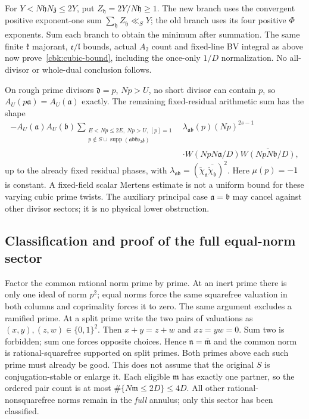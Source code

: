 For $Y<N\mathfrak hN\mathfrak z\le2Y$, put
$Z_{\mathfrak h}=2Y/N\mathfrak h\ge1$.
The new branch uses the convergent positive exponent-one sum
$\sum_{\mathfrak h}Z_{\mathfrak h}\ll_SY$; the old branch uses
its four positive $\Phi$ exponents. Sum each branch to obtain the
minimum after summation. The same finite $\mathfrak k$ majorant,
$\mathfrak e/\mathfrak l$ bounds, actual $A_2$ count and fixed-line
BV integral as above now prove~\eqref{cbk:cubic-bound}, including
the once-only $1/D$ normalization. No all-divisor or whole-dual
conclusion follows.

On rough prime divisors $\mathfrak d=p$, $Np>U$, no short divisor
can contain $p$, so $A_U(p\mathfrak a)=A_U(\mathfrak a)$ exactly.
The remaining fixed-residual arithmetic sum has the shape
\begin{equation}\label{cbk:prime-failure}
 \begin{split}
 -A_U(\mathfrak a)A_U(\mathfrak b)
 \sum_{\substack{E<Np\le2E,\ Np>U,\ [p]=1\\
      p\notin S\cup\operatorname{supp}(\mathfrak a\mathfrak b
                    \mathfrak k\mathfrak v_2\mathfrak z)}}
 &\lambda_{\mathfrak a\mathfrak b}(p)(Np)^{2s-1}\\[-2mm]
 &\cdot W(NpN\mathfrak a/D)\overline{W(NpN\mathfrak b/D)},
 \end{split}
\end{equation}
up to the already fixed residual phases, with
$\lambda_{\mathfrak a\mathfrak b}
 =(\widetilde\chi_{\mathfrak a}\overline{\widetilde\chi_{\mathfrak b}})^2$.
Here $\mu(p)=-1$ is constant. A fixed-field scalar Mertens estimate
is not a uniform bound for these varying cubic prime twists.
The auxiliary principal case $\mathfrak a=\mathfrak b$ may cancel
against other divisor sectors; it is no physical lower obstruction.

\subsection{Classification and proof of the full equal-norm sector}
\label{cbk:equal-proof}
Factor the common rational norm prime by prime. At an inert prime
there is only one ideal of norm $p^2$; equal norms force the same
squarefree valuation in both columns and coprimality forces it to
zero. The same argument excludes a ramified prime. At a split prime
write the two pairs of valuations as $(x,y),(z,w)\in\{0,1\}^2$.
Then $x+y=z+w$ and $xz=yw=0$. Sum two is forbidden; sum one forces
opposite choices. Hence $\mathfrak n=\bar{\mathfrak m}$ and the
common norm is rational-squarefree supported on split primes.
Both primes above each such prime must already be good. This does
not assume that the original $S$ is conjugation-stable or enlarge it.
Each eligible $\mathfrak m$ has exactly one partner, so the ordered
pair count is at most $\#\{N\mathfrak m\le2D\}\le4D$.
All other rational-nonsquarefree norms remain in the \emph{full}
annulus; only this sector has been classified.

